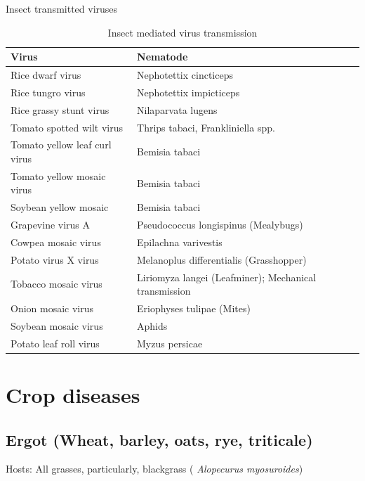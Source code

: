 \documentclass[
]{book}
\begin{document}
Insect transmitted viruses

\begin{table}

\caption{\label{tab:insect-transmissed-viruses}Insect mediated virus transmission}
\centering
\begin{tabular}[t]{ll}
\toprule
Virus & Nematode\\
\midrule
Rice dwarf virus & Nephotettix cincticeps\\
Rice tungro virus & Nephotettix impicticeps\\
Rice grassy stunt virus & Nilaparvata lugens\\
Tomato spotted wilt virus & Thrips tabaci, Frankliniella spp.\\
Tomato yellow leaf curl virus & Bemisia tabaci\\
\addlinespace
Tomato yellow mosaic virus & Bemisia tabaci\\
Soybean yellow mosaic & Bemisia tabaci\\
Grapevine virus A & Pseudococcus longispinus (Mealybugs)\\
Cowpea mosaic virus & Epilachna varivestis\\
Potato virus X virus & Melanoplus differentialis (Grasshopper)\\
\addlinespace
Tobacco mosaic virus & Liriomyza langei (Leafminer); Mechanical transmission\\
Onion mosaic virus & Eriophyses tulipae (Mites)\\
Soybean mosaic virus & Aphids\\
Potato leaf roll virus & Myzus persicae\\
\bottomrule
\end{tabular}
\end{table}

\hypertarget{crop-diseases}{%
\section{Crop diseases}\label{crop-diseases}}

\hypertarget{ergot-wheat-barley-oats-rye-triticale}{%
\subsection{Ergot (Wheat, barley, oats, rye, triticale)}\label{ergot-wheat-barley-oats-rye-triticale}}

Hosts:
All grasses, particularly, blackgrass ( \emph{Alopecurus myosuroides})
\end{document}
